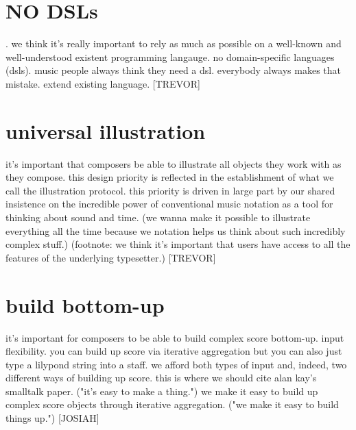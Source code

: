 \documentclass{article}
\begin{document}
\section{NO DSLs}.
we think it's really important to rely as much as possible on a well-known
and well-understood existent programming langauge. no domain-specific languages
(dsls). music people always think they need a dsl. everybody always makes that
mistake. extend existing language. [TREVOR]

\section{universal illustration}
it's important that composers be able to
illustrate all objects they work with as they compose. this design priority is
reflected in the establishment of what we call the illustration protocol. this
priority is driven in large part by our shared insistence on the incredible
power of conventional music notation as a tool for thinking about sound and
time. (we wanna make it possible to illustrate everything all the time because
we notation helps us think about such incredibly complex stuff.) (footnote: we
think it's important that users have access to all the features of the
underlying typesetter.) [TREVOR]

\section{build bottom-up}
it's important for composers to be able to build complex
score bottom-up. input flexibility. you can build up score via iterative
aggregation but you can also just type a lilypond string into a staff. we
afford both types of input and, indeed, two different ways of building up
score. this is where we should cite alan kay's smalltalk paper. ("it's easy to
make a thing.") we make it easy to build up complex score objects through
iterative aggregation. ("we make it easy to build things up.") [JOSIAH]
\end{document}
